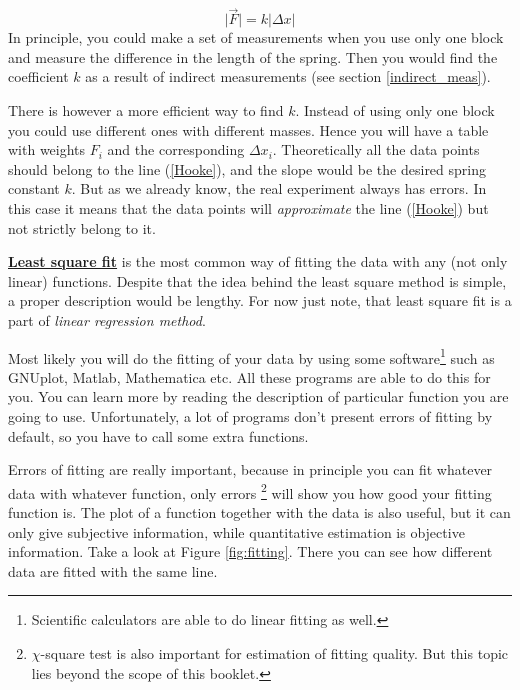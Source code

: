 \documentclass[12pt,a4paper]{article}
\newcommand{\definition}[1]{ \textcolor{MyRed}{\uline{\textbf {#1}}}}%
\begin{document}
\begin{equation} \label{Hooke}
\vert\vec{F}\vert = k\vert\Delta x\vert
\end{equation}
In principle, you could make a set of measurements when you use only one block and measure the difference in the length of the spring. Then you would find the coefficient $k$ as a result of indirect measurements (see section \ref{indirect_meas}).

There is however a more efficient way to find $k$. Instead of using only one block you could use different ones with different masses. Hence you will have a table with weights $F_i$ and the corresponding $\Delta x_i$. Theoretically all the data points should belong to the line (\ref{Hooke}), and the slope would be the desired spring constant $k$. But as we already know, the real experiment always has errors. In this case it means that the data points will \textit{approximate} the line (\ref{Hooke}) but not strictly belong to it.

\definition{Least square fit} is the most common way of fitting the data with any (not only linear) functions.
Despite that the idea behind the least square method is simple, a proper description would be lengthy. For now just note, that least square fit is a part of \textit{linear regression method}.

Most likely you will do the fitting of your data by using some software\footnote{Scientific calculators are able to do linear fitting as well.} such as GNUplot, Matlab, Mathematica etc. All these programs are able to do this for you. You can learn more by reading the description of particular function you are going to use.  Unfortunately, a lot of programs don't present errors of fitting by default, so you have to call some extra functions.

Errors of fitting are really important, because in principle you can fit whatever data with whatever function, only errors \footnote{$\chi$-square test is also important for estimation of fitting quality. But this topic lies beyond the scope of this booklet.} will show you how good your fitting function is. The plot of a function together with the data is also useful, but it can only give subjective information, while quantitative estimation is objective information. Take a look at Figure \ref{fig:fitting}. There you can see how different data are fitted with the same line.
\end{document}
